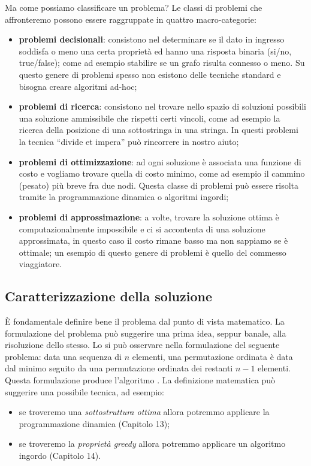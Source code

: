 Ma come possiamo classificare un problema?
Le classi di problemi che affronteremo possono essere raggruppate in quattro macro-categorie:
\begin{itemize}
	\item \textbf{problemi decisionali}: consistono nel determinare se il dato in ingresso soddisfa o meno una certa proprietà ed hanno una risposta binaria (si/no, true/false); come ad esempio stabilire se un grafo risulta connesso o meno.
	Su questo genere di problemi spesso non esistono delle tecniche standard e bisogna creare algoritmi ad-hoc;
	\item \textbf{problemi di ricerca}: consistono nel trovare nello spazio di soluzioni possibili una soluzione ammissibile che rispetti certi vincoli, come ad esempio la ricerca della posizione di una sottostringa in una stringa.
	In questi problemi la tecnica \enquote{divide et impera} può rincorrere in nostro aiuto;
	\item \textbf{problemi di ottimizzazione}: ad ogni soluzione è associata una funzione di costo e vogliamo trovare quella di costo minimo, come ad esempio il cammino (pesato) più breve fra due nodi.
	Questa classe di problemi può essere risolta tramite la programmazione dinamica o algoritmi ingordi;
	\item \textbf{problemi di approssimazione}: a volte, trovare la soluzione ottima è computazionalmente impossibile e ci si accontenta di una soluzione approssimata, in questo caso il costo rimane basso ma non sappiamo se è ottimale; un esempio di questo genere di problemi è quello del commesso viaggiatore.
\end{itemize}

\subsection*{Caratterizzazione della soluzione}

\`{E} fondamentale definire bene il problema dal punto di vista matematico.
La formulazione del problema può suggerire una prima idea, seppur banale, alla risoluzione dello stesso.
Lo si può osservare nella formulazione del seguente problema: data una sequenza di \(n\) elementi, una permutazione ordinata è data dal minimo seguito da una permutazione ordinata dei restanti \(n-1\) elementi.
Questa formulazione produce l'algoritmo \selectionSort.
La definizione matematica può suggerire una possibile tecnica, ad esempio:
\begin{itemize}
	\item se troveremo una \emph{sottostruttura ottima} allora potremmo applicare la programmazione dinamica (Capitolo 13);
	\item se troveremo la \emph{proprietà greedy} allora potremmo applicare un algoritmo ingordo (Capitolo 14).
\end{itemize}

